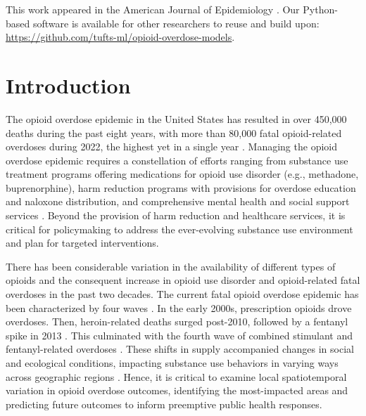 This work appeared in the American Journal of Epidemiology \citep{heutonSpatiotemporalForecastingOpioidrelated2024}.  Our Python-based software is available for other researchers to reuse and build upon: \href{https://github.com/tufts-ml/opioid-overdose-models}{\ul{https://github.com/tufts-ml/opioid-overdose-models}}.

\section{Introduction}\label{introduction}

The opioid overdose epidemic in the United States has resulted in over 450,000 deaths during the past eight years, with more than 80,000 fatal opioid-related overdoses during 2022, the highest yet in a single year \citep{fbahmadProvisionalDrugOverdose2023}.
Managing the opioid overdose epidemic requires a constellation of efforts ranging from substance use treatment programs offering medications for opioid use disorder (e.g., methadone, buprenorphine), \citep{mattickBuprenorphineMaintenancePlacebo2014,leshnerMedicationsOpioidUse2019} harm reduction programs with provisions for overdose education and naloxone distribution, and comprehensive mental health and social support services \citep{clarkSystematicReviewCommunity2014,hawkReducingFatalOpioid2015,peiperFentanylTestStrips2019}.
Beyond the provision of harm reduction and healthcare services, it is critical for policymaking to address the ever-evolving substance use environment and plan for targeted interventions.

There has been considerable variation in the availability of different types of opioids and the consequent increase in opioid use disorder and opioid-related fatal overdoses in the past two decades. The current fatal opioid overdose epidemic has been characterized by four waves \citep{ciccaroneTripleWaveEpidemic2019,ciccaroneRiseIllicitFentanyls2021}. In the early 2000s, prescription opioids drove overdoses. Then, heroin-related deaths surged post-2010, followed by a fentanyl spike in 2013 \citep{UnderstandingOpioidOverdose2023}. This culminated with the fourth wave of combined stimulant and fentanyl-related overdoses \citep{ciccaroneRiseIllicitFentanyls2021}. These shifts in supply accompanied changes in social and ecological conditions, impacting substance use behaviors in varying ways across geographic regions \citep{stopkaOpioidrelatedMortalityDynamic2023,friedmanOpioidOverdoseCrisis2020}. Hence, it is critical to examine local spatiotemporal variation in opioid overdose outcomes, identifying the most-impacted areas and predicting future outcomes to inform preemptive public health responses.

